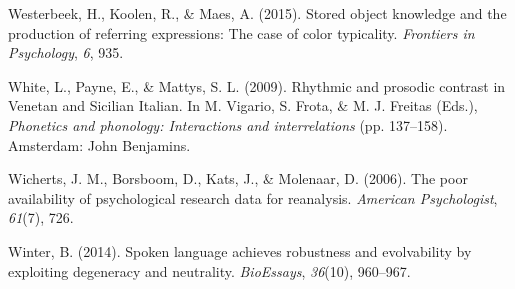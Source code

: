 \documentclass[
  english,
  man,floatsintext]{apa6}
\begin{document}
\leavevmode\hypertarget{ref-westerbeek2015stored}{}%
Westerbeek, H., Koolen, R., \& Maes, A. (2015). Stored object knowledge and the production of referring expressions: The case of color typicality. \emph{Frontiers in Psychology}, \emph{6}, 935.

\leavevmode\hypertarget{ref-white2009}{}%
White, L., Payne, E., \& Mattys, S. L. (2009). Rhythmic and prosodic contrast in Venetan and Sicilian Italian. In M. Vigario, S. Frota, \& M. J. Freitas (Eds.), \emph{Phonetics and phonology: Interactions and interrelations} (pp. 137--158). Amsterdam: John Benjamins.

\leavevmode\hypertarget{ref-wicherts2006poor}{}%
Wicherts, J. M., Borsboom, D., Kats, J., \& Molenaar, D. (2006). The poor availability of psychological research data for reanalysis. \emph{American Psychologist}, \emph{61}(7), 726.

\leavevmode\hypertarget{ref-winter2014spoken}{}%
Winter, B. (2014). Spoken language achieves robustness and evolvability by exploiting degeneracy and neutrality. \emph{BioEssays}, \emph{36}(10), 960--967.

\endgroup
\end{document}
